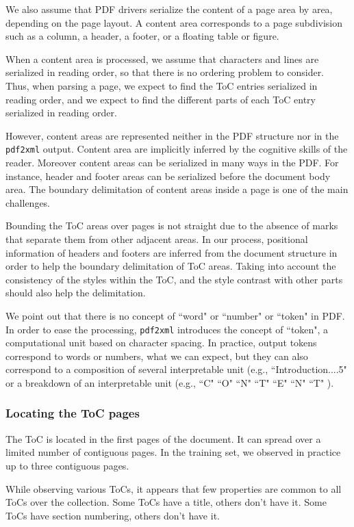 We also assume that PDF drivers serialize the content of a page area by area, depending on the page layout. A content area corresponds to a page subdivision such as a column, a header, a footer, or a floating table or figure. 

When a content area is processed, we assume that characters and lines are serialized in reading order, so that there is no ordering problem to consider. Thus, when parsing a page, we expect to find the ToC entries serialized in reading order, and we expect to find the different parts of each ToC entry serialized in reading order.

However, content areas are represented neither in the PDF structure nor in the \texttt{pdf2xml} output. Content area are implicitly inferred by the cognitive skills of the reader. Moreover content areas can be serialized in many ways in the PDF. For instance, header and footer areas can be serialized before the document body area. The boundary delimitation of content areas inside a page is one of the main challenges. 

Bounding the ToC areas over pages is not straight due to the absence of marks that separate them from other adjacent areas. In our process, positional information of headers and footers are inferred from the document structure in order to help the boundary delimitation of ToC areas. Taking into account the consistency of the styles within the ToC, and the style contrast with other parts should also help the delimitation.

We point out that there is no concept of ``word" or ``number" or ``token" in PDF. In order to ease the processing, \texttt{pdf2xml} introduces the concept of ``token", a computational unit based on character spacing. In practice, output tokens correspond to words or numbers, what we can expect, but they can also correspond to a composition of several interpretable unit (e.g., ``Introduction....5" or a breakdown of an interpretable unit (e.g., ``C" ``O" ``N" ``T" ``E" ``N" ``T" ).

\subsubsection{Locating the ToC pages}

The ToC is located in the first pages of the document. It can spread over a limited number of contiguous pages. In the training set, we observed in practice up to three contiguous pages. 

While observing various ToCs, it appears that few properties are common to all ToCs over the collection. Some ToCs have a title, others don't have it. Some ToCs have section numbering, others don't have it.

